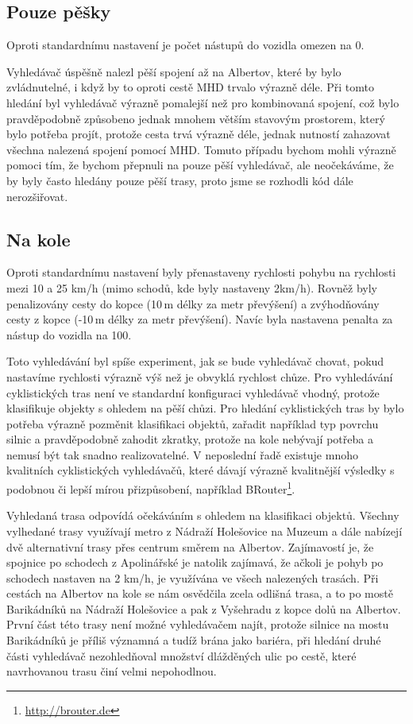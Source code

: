 \subsection{Pouze pěšky}
Oproti standardnímu nastavení je počet nástupů do vozidla omezen na 0.

Vyhledávač úspěšně nalezl pěší spojení až na Albertov, které by bylo
zvládnutelné, i když by to oproti cestě MHD trvalo výrazně déle. Při tomto
hledání byl vyhledávač výrazně pomalejší než pro kombinovaná spojení, což bylo
pravděpodobně způsobeno jednak mnohem větším stavovým prostorem, který bylo
potřeba projít, protože cesta trvá výrazně déle, jednak nutností zahazovat
všechna nalezená spojení pomocí MHD. Tomuto případu bychom mohli výrazně pomoci
tím, že bychom přepnuli na pouze pěší vyhledávač, ale neočekáváme, že by byly
často hledány pouze pěší trasy, proto jsme se rozhodli kód dále nerozšiřovat.
\subsection{Na kole}
Oproti standardnímu nastavení byly přenastaveny rychlosti pohybu na rychlosti
mezi 10 a 25 km/h (mimo schodů, kde byly nastaveny 2km/h). Rovněž byly
penalizovány cesty do kopce (10\,m délky za metr převýšení) a zvýhodňovány cesty z
kopce (-10\,m délky za metr převýšení). Navíc byla nastavena penalta za nástup
do vozidla na 100.

Toto vyhledávání byl spíše experiment, jak se bude vyhledávač chovat, pokud
nastavíme rychlosti výrazně výš než je obvyklá rychlost chůze. Pro vyhledávání
cyklistických tras není ve standardní konfiguraci vyhledávač vhodný, protože
klasifikuje objekty s ohledem na pěší chůzi. Pro hledání cyklistických tras by
bylo potřeba výrazně pozměnit klasifikaci objektů, zařadit například typ povrchu
silnic a pravděpodobně zahodit zkratky, protože na kole nebývají potřeba a
nemusí být tak snadno realizovatelné. V neposlední řadě existuje mnoho
kvalitních cyklistických vyhledávačů, které dávají výrazně kvalitnější výsledky
s podobnou či lepší mírou přizpůsobení, například
BRouter\footnote{\url{http://brouter.de}}.

Vyhledaná trasa odpovídá očekáváním s ohledem na klasifikaci objektů. Všechny
vylhedané trasy využívají metro z Nádraží Holešovice na Muzeum a dále nabízejí
dvě alternativní trasy přes centrum směrem na Albertov. Zajímavostí je, že
spojnice po schodech z Apolinářské je natolik zajímavá, že ačkoli je pohyb po
schodech nastaven na 2 km/h, je využívána ve všech nalezených trasách. Při
cestách na Albertov na kole se nám osvědčila zcela odlišná trasa, a to po mostě
Barikádníků na Nádraží Holešovice a pak z Vyšehradu z kopce dolů na Albertov.
První část této trasy není možné vyhledávačem najít, protože silnice na mostu
Barikádníků je příliš významná a tudíž brána jako bariéra, při hledání druhé
části vyhledávač nezohledňoval množství dlážděných ulic po cestě, které
navrhovanou trasu činí velmi nepohodlnou.

